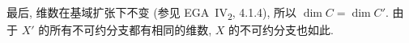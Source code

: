 最后, 维数在基域扩张下不变 (参见 EGA~IV\textsubscript{2}, 4.1.4),
所以 \(\dim C=\dim C'\).
由于 \(X'\) 的所有不可约分支都有相同的维数,
\(X\) 的不可约分支也如此.

